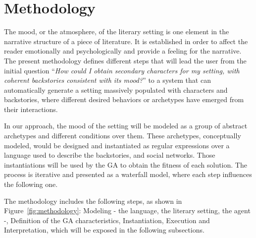 \documentclass{sig-alternate}
\begin{document}

%
%

\section{Methodology}
\label{sec:methodology}

The mood, or the atmosphere, of the literary setting is one element in the narrative structure of a piece of literature. It is established in order to affect the reader emotionally and psychologically and provide a feeling for the narrative.
\\

The present methodology defines different steps that will lead the user from the initial question ``\textit{How could I obtain secondary characters for my setting, with coherent backstories consistent with its mood?}'' to a system that can automatically generate a setting massively populated with characters and backstories, where different desired behaviors or archetypes have emerged from their interactions.

In our approach, the mood of the setting will be modeled as a group of abstract archetypes and different conditions over them. These archetypes, conceptually modeled, would be designed and instantiated as regular expressions over a language used to describe the backstories, and social networks. Those instantiations will be used by the GA to obtain the fitness of each solution. The process is iterative and presented as a waterfall model, where each step influences the following one.

The methodology includes the following steps, as shown in Figure~\ref{fig:methodology}: Modeling - the language, the literary setting, the agent -, Definition of the GA characteristics, Instantiation, Execution and Interpretation, which will be exposed in the following subsections.
\end{document}
